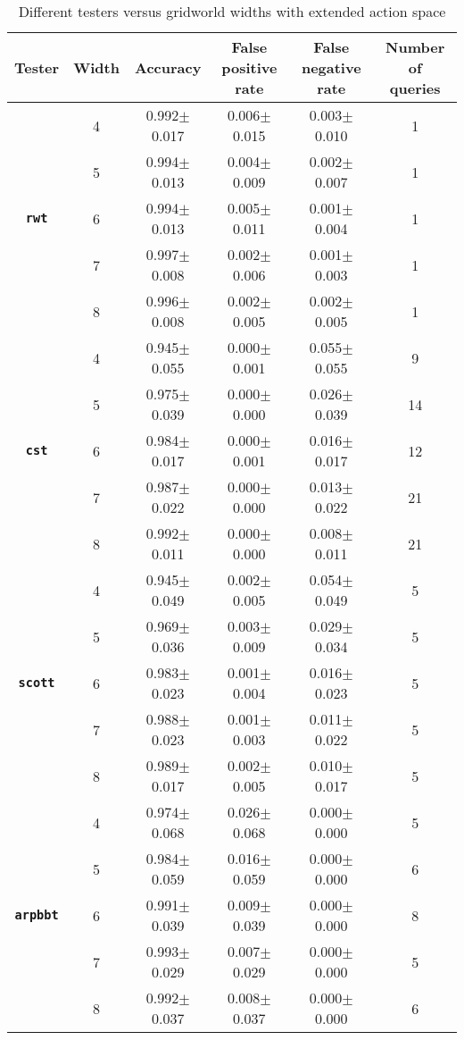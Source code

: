 \begin{table}[h]
    
    \caption{Different testers versus gridworld widths with extended action space}
  \label{tab:diag_exp}
  \centering
  \begin{tabular}{cccccc}
  \\
    \toprule
    \textbf{Tester}     & \textbf{Width}     & \textbf{Accuracy} & \textbf{False positive rate} & \textbf{False negative rate} & \textbf{Number of queries} \\
    \midrule
     & 4 & 0.992$\pm$	0.017&	0.006$\pm$	0.015&	0.003$\pm$	0.010&	1\\
     & 5 & 0.994$\pm$	0.013&	0.004$\pm$	0.009&	0.002$\pm$	0.007&	1\\
     \textbf{\texttt{rwt}}& 6 & 0.994$\pm$	0.013&	0.005$\pm$	0.011&	0.001$\pm$	0.004&	1\\
     & 7 & 0.997$\pm$	0.008&	0.002$\pm$	0.006&	0.001$\pm$	0.003&	1\\
     & 8 & 0.996$\pm$	0.008&	0.002$\pm$	0.005&	0.002$\pm$	0.005&	1\\
     \midrule
     & 4 & 0.945$\pm$	0.055&	0.000$\pm$	0.001&	0.055$\pm$	0.055&	9\\
     & 5 & 0.975$\pm$	0.039&	0.000$\pm$	0.000&	0.026$\pm$	0.039&	14\\
     \textbf{\texttt{cst}}& 6 & 0.984$\pm$	0.017&	0.000$\pm$	0.001&	0.016$\pm$	0.017&	12\\
     & 7 & 0.987$\pm$	0.022&	0.000$\pm$	0.000&	0.013$\pm$	0.022&	21\\
     & 8 & 0.992$\pm$	0.011&	0.000$\pm$	0.000&	0.008$\pm$	0.011&	21\\
     \midrule
      & 4 & 0.945$\pm$	0.049&	0.002$\pm$	0.005&	0.054$\pm$	0.049&	5\\
     & 5 & 0.969$\pm$	0.036&	0.003$\pm$	0.009&	0.029$\pm$	0.034&	5\\
     \textbf{\texttt{scott}}& 6 & 0.983$\pm$	0.023&	0.001$\pm$	0.004&	0.016$\pm$	0.023&	5\\
     & 7 & 0.988$\pm$	0.023&	0.001$\pm$	0.003&	0.011$\pm$	0.022&	5\\
     & 8 & 0.989$\pm$	0.017&	0.002$\pm$	0.005&	0.010$\pm$	0.017&	5\\
     \midrule
      & 4 & 0.974$\pm$	0.068&	0.026$\pm$	0.068&	0.000$\pm$	0.000&	5\\
     & 5 & 0.984$\pm$	0.059&	0.016$\pm$	0.059&	0.000$\pm$	0.000&	6\\
     \textbf{\texttt{arpbbt}}& 6 & 0.991$\pm$	0.039&	0.009$\pm$	0.039&	0.000$\pm$	0.000&	8\\
     & 7 & 0.993$\pm$	0.029&	0.007$\pm$	0.029&	0.000$\pm$	0.000&	5\\
     & 8 & 0.992$\pm$	0.037&	0.008$\pm$	0.037&	0.000$\pm$	0.000&	6\\
\bottomrule
    \end{tabular}
\end{table}


